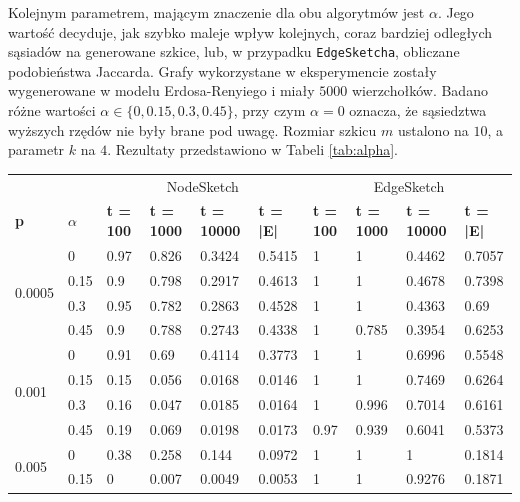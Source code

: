     Kolejnym parametrem, mającym znaczenie dla obu algorytmów jest $\alpha$. Jego wartość decyduje, jak szybko maleje wpływ kolejnych, coraz bardziej odległych sąsiadów na generowane szkice, lub, w przypadku \texttt{EdgeSketcha}, obliczane podobieństwa Jaccarda. Grafy wykorzystane w eksperymencie zostały wygenerowane w modelu Erdosa-Renyiego i miały $5000$ wierzchołków. Badano różne wartości $\alpha \in \{0, 0.15, 0.3, 0.45\}$, przy czym $\alpha = 0$ oznacza, że sąsiedztwa wyższych rzędów nie były brane pod uwagę. Rozmiar szkicu $m$ ustalono na $10$, a parametr $k$ na $4$. Rezultaty przedstawiono w Tabeli \ref{tab:alpha}.

    \begin{table}[!ht]
        \small
        \centering
        \begin{tabular}{|l|l|l|l|l|l|l|l|l|l|}
        \hline
            & & \multicolumn{4}{c|}{NodeSketch} & \multicolumn{4}{c|}{EdgeSketch} \\ \cline{1-10}
            \textbf{p} & \textbf{$\alpha$} & \textbf{t = 100} & \textbf{t = 1000} & \textbf{t = 10000} & \textbf{t = |E|} & \textbf{t = 100} & \textbf{t = 1000} & \textbf{t = 10000} & \textbf{t = |E|} \\ \hline\hline
        \multirow{4}{*}{0.0005} & 0 & 0.97 & 0.826 & 0.3424 & 0.5415 & 1 & 1 & 0.4462 & 0.7057 \\ \cline{2-10}
            & 0.15 & 0.9 & 0.798 & 0.2917 & 0.4613 & 1 & 1 & 0.4678 & 0.7398 \\ \cline{2-10}
            & 0.3 & 0.95 & 0.782 & 0.2863 & 0.4528 & 1 & 1 & 0.4363 & 0.69 \\ \cline{2-10}
            & 0.45 & 0.9 & 0.788 & 0.2743 & 0.4338 & 1 & 0.785 & 0.3954 & 0.6253 \\ \hline\hline
        \multirow{4}{*}{0.001}    & 0 & 0.91 & 0.69 & 0.4114 & 0.3773 & 1 & 1 & 0.6996 & 0.5548 \\ \cline{2-10}
            & 0.15 & 0.15 & 0.056 & 0.0168 & 0.0146 & 1 & 1 & 0.7469 & 0.6264\\ \cline{2-10}
            & 0.3 & 0.16 & 0.047 & 0.0185 & 0.0164 & 1 & 0.996 & 0.7014 & 0.6161 \\ \cline{2-10}
            & 0.45 & 0.19 & 0.069 & 0.0198 & 0.0173 & 0.97 & 0.939 & 0.6041 & 0.5373 \\ \hline\hline
        \multirow{4}{*}{0.005}    & 0 & 0.38 & 0.258 & 0.144 & 0.0972 & 1 & 1 & 1 & 0.1814 \\ \cline{2-10}
            & 0.15 & 0 & 0.007 & 0.0049 & 0.0053 & 1 & 1 & 0.9276 & 0.1871 \\ \cline{2-10}

\end{tabular}
\end{table}
